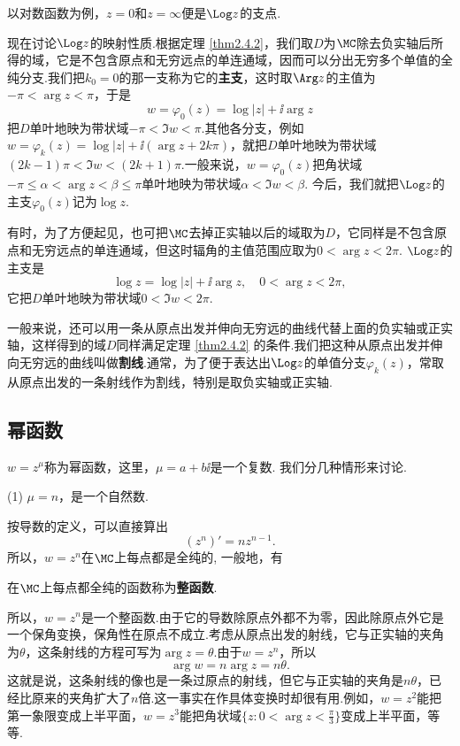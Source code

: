 以对数函数为例，$z=0$和$z=\infty$便是$\Log z$的支点.

现在讨论$\Log z$的映射性质.根据定理 \ref{thm2.4.2}，我们取$D$为$\MC$除去负实轴后所得的域，它是不包含原点和无穷远点的单连通域，因而可以分出无穷多个单值的全纯分支.我们把$k_0=0$的那一支称为它的\textbf{主支}，这时取$\Arg z$的主值为$-\pi<\arg z<\pi$，于是
\[w=\varphi_0(z)=\log|z|+\ii\arg z\]
把$D$单叶地映为带状域$-\pi<\Im w<\pi$.其他各分支，例如$w=\varphi_k(z)=\log|z|+\ii(\arg z+2k\pi)$，就把$D$单叶地映为带状域$(2k-1)\pi<\Im w<(2k+1)\pi$.一般来说，$w=\varphi_0(z)$把角状域$-\pi\le\alpha<\arg z<\beta\le\pi$单叶地映为带状域$\alpha<\Im w<\beta$. 今后，我们就把$\Log z$的主支$\varphi_0(z)$记为$\log z$.

有时，为了方便起见，也可把$\MC$去掉正实轴以后的域取为$D$，它同样是不包含原点和无穷远点的单连通域，但这时辐角的主值范围应取为$0<\arg z<2\pi$. $\Log z$的主支是
\[\log z=\log|z|+\ii\arg z,\quad 0<\arg z<2\pi,\]
它把$D$单叶地映为带状域$0<\Im w<2\pi$.

一般来说，还可以用一条从原点出发并伸向无穷远的曲线代替上面的负实轴或正实轴，这样得到的域$D$同样满足定理 \ref{thm2.4.2} 的条件.我们把这种从原点出发并伸向无穷远的曲线叫做\textbf{割线}.通常，为了便于表达出$\Log z$的单值分支$\varphi_k(z)$，常取从原点出发的一条射线作为割线，特别是取负实轴或正实轴.

\subsection{幂函数}
$w=z^\mu$称为幂函数，这里，$\mu=a+b\ii$是一个复数. 我们分几种情形来讨论.

(1) $\mu=n$，{\kaishu 是一个自然数.}

按导数的定义，可以直接算出
\[(z^n)'=nz^{n-1}.\]
所以，$w=z^n$在$\MC$上每点都是全纯的, 一般地，有
\begin{definition}\label{def2.4.4}
  在$\MC$上每点都全纯的函数称为\textbf{整函数}.
\end{definition}

所以，$w=z^n$是一个整函数.由于它的导数除原点外都不为零，因此除原点外它是一个保角变换，保角性在原点不成立.考虑从原点出发的射线，它与正实轴的夹角为$\theta$，这条射线的方程可写为$\arg z=\theta$.由于$w=z^n$，所以
\[\arg w=n\arg z=n\theta.\]
这就是说，这条射线的像也是一条过原点的射线，但它与正实轴的夹角是$n\theta$，已经比原来的夹角扩大了$n$倍.这一事实在作具体变换时却很有用.例如，$w=z^2$能把第一象限变成上半平面，$w=z^3$能把角状域$\bigg\{z:0<\arg z<\frac\pi3\bigg\}$变成上半平面，等等.

